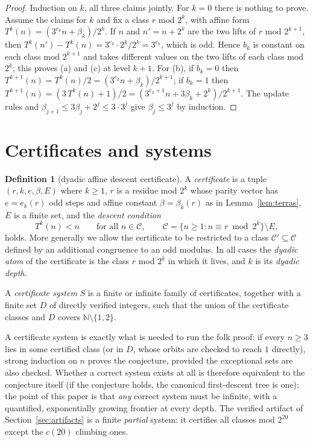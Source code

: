 \documentclass[11pt]{article}
\theoremstyle{definition}
\newtheorem{definition}[theorem]{Definition}
\newcommand{\N}{\mathbb{N}}
\begin{document}
\begin{proof}
Induction on $k$, all three claims jointly. For $k=0$ there is nothing to
prove. Assume the claims for $k$ and fix a class $r$ mod $2^k$, with affine
form $T^k(n)=(3^{e_k}n+\beta_k)/2^k$. If $n$ and $n'=n+2^k$ are the two
lifts of $r$ mod $2^{k+1}$, then
$T^k(n')-T^k(n)=3^{e_k}\cdot 2^k/2^k=3^{e_k}$, which is odd. Hence
$b_k$ is constant on each class mod $2^{k+1}$ and takes different values on
the two lifts of each class mod $2^k$; this proves (a) and (c) at level
$k+1$. For (b), if $b_k=0$ then $T^{k+1}(n)=T^k(n)/2=(3^{e_k}n+\beta_k)/2^{k+1}$;
if $b_k=1$ then
$T^{k+1}(n)=(3\,T^k(n)+1)/2=(3^{e_k+1}n+3\beta_k+2^k)/2^{k+1}$.
The update rules and $\beta_{j+1}\le 3\beta_j+2^j\le 3\cdot 3^j$ give
$\beta_j\le 3^j$ by induction.
\end{proof}

\section{Certificates and systems}\label{sec:cert}

\begin{definition}[dyadic affine descent certificate]\label{def:cert}
A \emph{certificate} is a tuple $(r,k,e,\beta,E)$ where $k\ge 1$, $r$ is a
residue mod $2^k$ whose parity vector has $e=e_k(r)$ odd steps and affine
constant $\beta=\beta_k(r)$ as in Lemma~\ref{lem:terras}, $E$ is a finite
set, and the \emph{descent condition}
\[
T^k(n)<n \qquad\text{for all } n\in \mathcal{C},\qquad
\mathcal{C}=\{n\ge 1: n\equiv r \bmod 2^k\}\setminus E ,
\]
holds. More generally we allow the certificate to be restricted to a class
$\mathcal{C}'\subseteq\mathcal{C}$ defined by an additional congruence to an
odd modulus. In all cases the \emph{dyadic atom} of the certificate is the
class $r$ mod $2^k$ in which it lives, and $k$ is its \emph{dyadic depth}.

A \emph{certificate system} $S$ is a finite or infinite family of
certificates, together with a finite set $D$ of directly verified integers,
such that the union of the certificate classes and $D$ covers
$\N\setminus\{1,2\}$.
\end{definition}

A certificate system is exactly what is needed to run the folk proof: if
every $n\ge 3$ lies in some certified class (or in $D$, whose orbits are
checked to reach $1$ directly), strong induction on $n$ proves the
conjecture, provided the exceptional sets are also checked. Whether a
correct system exists at all is therefore equivalent to the conjecture
itself (if the conjecture holds, the canonical first-descent tree is one);
the point of this paper is that \emph{any} correct system must be infinite,
with a quantified, exponentially growing frontier at every depth. The
verified artifact of Section~\ref{sec:artifacts} is a finite \emph{partial}
system: it certifies all classes mod $2^{20}$ except the $c(20)$ climbing
ones.
\end{document}

